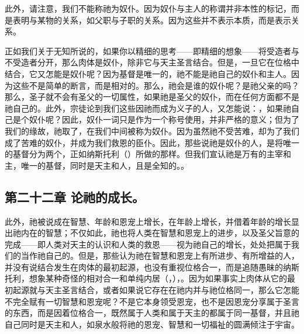 此外，请注意，我们不能称祂为奴仆。因为奴仆与主人的称谓并非本性的标记，而是表明与某物的关系，如父职与子职的关系。因为这些并不表示本质，而是表示关系。\par

正如我们关于无知所说的，如果你以精细的思考——即精细的想象——将受造者与不受造者分开，那么肉体是奴仆，除非它与天主圣言结合。但是，一旦它在位格中结合，它又怎能是奴仆呢？因为基督是唯一的，祂不能是祂自己的奴仆和主人。因为这些不是简单的断言，而是相对的。那么，祂会是谁的奴仆呢？是祂父亲的吗？那么，圣子就不会有圣父的一切属性，如果祂是圣父的奴仆，而在任何方面都不是祂自己的。此外，宗徒论到我们这些因祂而成为义子的人，又怎能说：，如果祂自己是个奴仆呢？因此，奴仆一词只是作为一个称号使用，并非严格的意义；但为了我们的缘故，祂取了，在我们中间被称为奴仆。因为虽然祂不受苦难，却为了我们成了苦难的奴仆，并成为我们救恩的臣仆。因此，那些说祂是奴仆的人，是将唯一的基督分为两个，正如纳斯托利（）所做的那样。但我们宣认祂是万有的主宰和主，唯一的基督，同时是天主和人，且是全知的。。\par


\subsection{第二十二章 论祂的成长。}

此外，祂被说成在智慧、年龄和恩宠上增长，在年龄上增长，并借着年龄的增长显出祂内在的智慧；不仅如此，祂也将人类在智慧和恩宠上的进步，以及圣父旨意的完成——即人类对天主的认识和人类的救恩——视为祂自己的增长，处处把属于我们的当作祂自己的。但是，那些认为祂在智慧和恩宠上有所进步、有所增益的人，并没有说结合发生在肉体的最初起源，也没有重视位格合一，而是追随愚昧的纳斯托利，想象某种奇怪的相对合一和单纯内居（，），。因为如果事实上肉体从它的最初起源就与天主圣言结合，或者如果说它存在在祂内并与祂位格同一，那么它怎能不完全赋有一切智慧和恩宠呢？不是它本身领受恩宠，也不是因恩宠分享属于圣言的东西，而是因着位格合一，既然属于人类和属于天主的都属于同一基督，并且祂自己同时是天主和人，如泉水般将祂的恩宠、智慧和一切福祉的圆满倾注于宇宙。\par

